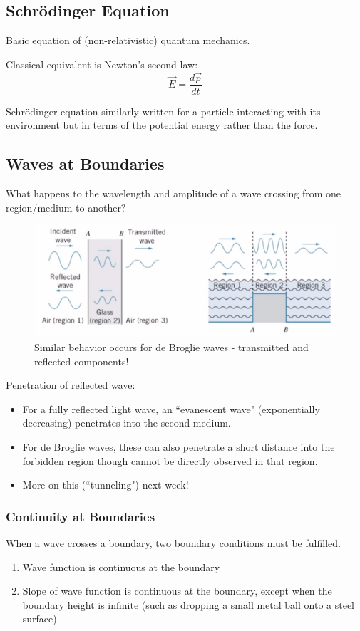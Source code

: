 \documentclass[class=article,crop=false]{standalone}
\begin{document}
\subsection{Schrödinger Equation}
Basic equation of (non-relativistic) quantum mechanics.

Classical equivalent is Newton's second law:
$$ \vec{E} = \frac{d\vec{p}}{dt} $$

Schrödinger equation similarly written for a particle interacting with its environment but in terms of the potential energy rather than the force.\\

\subsection{Waves at Boundaries}
What happens to the wavelength and amplitude of a wave crossing from one region/medium to another?\\

\begin{figure}[h!]
	\centering
	\includegraphics[width=.7\linewidth]{./Images/boundary.png}
	\caption{Similar behavior occurs for de Broglie waves - transmitted and reflected components!}
\end{figure}

Penetration of reflected wave:
\begin{itemize}
	\item For a fully reflected light wave, an ``evanescent wave" (exponentially decreasing) penetrates into the second medium.
	\item For de Broglie waves, these can also penetrate a short distance into the forbidden region though cannot be directly observed in that region.
	\item More on this (``tunneling") next week!
\end{itemize}

\subsubsection{Continuity at Boundaries}
When a wave crosses a boundary, two boundary conditions must be fulfilled.
\begin{enumerate}
	\item Wave function is continuous at the boundary
	\item Slope of wave function is continuous at the boundary, except when the boundary height is infinite (such as dropping a small metal ball onto a steel surface)
\end{enumerate}
\end{document}
